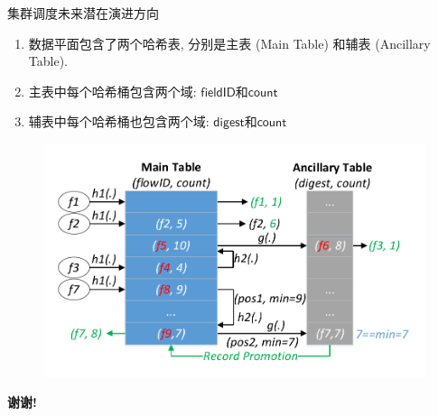\documentclass{beamer}
\newcommand{\field}{\mathsf}
\begin{document}
\begin{frame}{集群调度未来潜在演进方向}
\begin{enumerate}
\item 数据平面包含了两个哈希表, 分别是主表 (Main Table) 和辅表 (Ancillary Table).
\item 主表中每个哈希桶包含两个域: $\field{fieldID}$和$\field{count}$
\item 辅表中每个哈希桶也包含两个域: $\field{digest}$和$\field{count}$
\end{enumerate}
\begin{figure}
	\centering
	\includegraphics[width=0.6\linewidth]{figures/representation/datastructure}
\end{figure}

\end{frame}

  
\begin{frame}{}
\begin{center}
    \textbf{谢谢!}
\end{center}
\end{frame}
\end{document}
